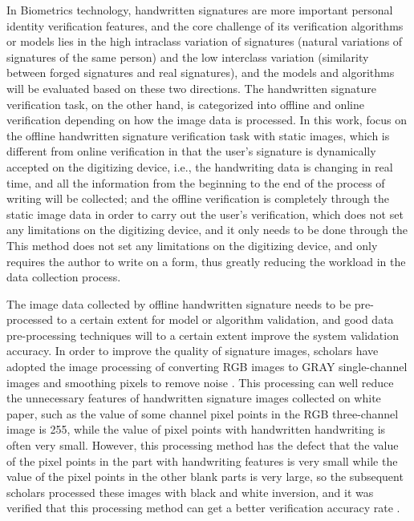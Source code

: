 In Biometrics technology, handwritten signatures are more important personal identity verification features, and the core challenge of its verification algorithms or models lies in the high intraclass variation of signatures (natural variations of signatures of the same person) and the low interclass variation (similarity between forged signatures and real signatures), and the models and algorithms will be evaluated based on these two directions. The handwritten signature verification task, on the other hand, is categorized into offline and online verification depending on how the image data is processed. In this work, focus on the offline handwritten signature verification task with static images, which is different from online verification in that the user's signature is dynamically accepted on the digitizing device, i.e., the handwriting data is changing in real time, and all the information from the beginning to the end of the process of writing will be collected; and the offline verification is completely through the static image data in order to carry out the user's verification, which does not set any limitations on the digitizing device, and it only needs to be done through the This method does not set any limitations on the digitizing device, and only requires the author to write on a form, thus greatly reducing the workload in the data collection process.

The image data collected by offline handwritten signature needs to be pre-processed to a certain extent for model or algorithm validation, and good data pre-processing techniques will to a certain extent improve the system validation accuracy. In order to improve the quality of signature images, scholars have adopted the image processing of converting RGB images to GRAY single-channel images and smoothing pixels to remove noise \cite{40}. This processing can well reduce the unnecessary features of handwritten signature images collected on white paper, such as the value of some channel pixel points in the RGB three-channel image is 255, while the value of pixel points with handwritten handwriting is often very small. However, this processing method has the defect that the value of the pixel points in the part with handwriting features is very small while the value of the pixel points in the other blank parts is very large, so the subsequent scholars processed these images with black and white inversion, and it was verified that this processing method can get a better verification accuracy rate \cite{11}.

